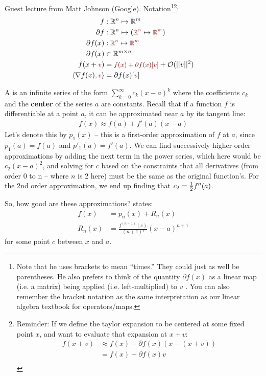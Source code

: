 \documentclass[11pt]{article}
\begin{document}
Guest lecture from Matt Johnson (Google). Notation\footnote{Note that he uses brackets to mean ``times.'' They could just as well be parentheses. He also prefers to think of the quantity $\partial f(x)$ as a linear map (i.e. a matrix) being applied (i.e. left-multiplied) to $v$ . You can also remember the bracket notation as the same interpretation as our linear algebra textbook for operators/maps.}\footnote{Reminder: If we define the taylor expansion to be centered at some fixed point $x$, and want to evaluate that expansion at $x + v$: 
	\begin{align}
		f(x + v) &\approx f(x) + \partial f(x) (x - (x + v)) \\
			&=  f(x) + \partial f(x) v \\
	\end{align}
 }:
\begin{align}
		f &: \R^n \mapsto \R^m \\
		\partial f &: \R^n \mapsto \lr{ \mred{\R^n} \mapsto \mred{\R^m} } \\
		\partial f(x) &: \mred{\R^n} \mapsto \mred{\R^m} \\
		\partial f(x) &\in \R^{m \times n} \\
		f(x + \mred{v})
			&= \mred{ f(x) + \partial f(x)[v]  } + \mathcal{O}(||v||^2) \\
		\langle \nabla f(x), \mred{v} \rangle
			&= \partial f(x)[\mred{v}]
\end{align}

\begin{example}
	A  is an infinite series of the form $\sum_{k=0}^{\infty} c_k (x - a)^k$ where the coefficients $c_k$ and the \textbf{center} of the series $a$ are constants. Recall that if a function $f$ is differentiable at a point $a$, it can be approximated near $a$ by its tangent line:
	\begin{align}
		f(x) \approx f(a) + f'(a) (x - a)
	\end{align}
	Let's denote this by $p_1(x)$ -- this is a first-order approximation of $f$ at $a$, since $p_1(a) = f(a)$ and $p'_1(a) = f'(a)$. We can find successively higher-order approximations by adding the next term in the power series, which here would be $c_2(x - a)^2$, and solving for $c$ based on the constraints that all derivatives (from order 0 to n -- where $n$ is 2 here) must be the same as the original function's. For the 2nd order approximation, we end up finding that $c_2 = \frac{1}{2} f''(a)$. 
	
	So, how good are these approximations?  states:
	\begin{align}
		f(x) 
			&= p_n(x) + R_n(x) \\
		R_n(x) 
			&= \frac{  f^{ (n+1)}(c) }{ (n + 1)! } (x - a)^{n+1} 
	\end{align}
	for some point $c$ between $x$ and $a$. 
\end{example}
\end{document}
